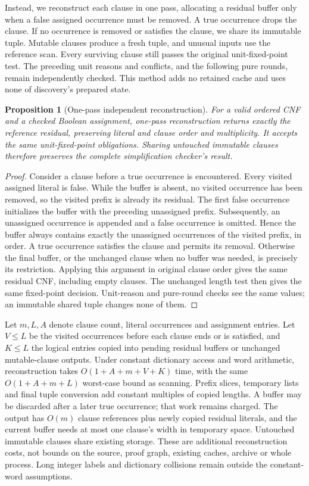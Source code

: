\documentclass[11pt,a4paper]{article}
\numberwithin{equation}{section}
\theoremstyle{plain}
\newtheorem{proposition}[lemma]{Proposition}
\theoremstyle{definition}
\theoremstyle{remark}
\begin{document}
Instead, we reconstruct each clause in one pass, allocating a residual buffer only when a false assigned occurrence must be removed. A true occurrence drops the clause. If no occurrence is removed or satisfies the clause, we share its immutable tuple. Mutable clauses produce a fresh tuple, and unusual inputs use the reference scan. Every surviving clause still passes the original unit-fixed-point test. The preceding unit reasons and conflicts, and the following pure rounds, remain independently checked. This method adds no retained cache and uses none of discovery's prepared state.

\begin{proposition}[One-pass independent reconstruction]
\label{prop:single-pass-check}
For a valid ordered CNF and a checked Boolean assignment, one-pass reconstruction returns exactly the reference residual, preserving literal and clause order and multiplicity. It accepts the same unit-fixed-point obligations. Sharing untouched immutable clauses therefore preserves the complete simplification checker's result.
\end{proposition}
\begin{proof}
Consider a clause before a true occurrence is encountered. Every visited assigned literal is false. While the buffer is absent, no visited occurrence has been removed, so the visited prefix is already its residual. The first false occurrence initializes the buffer with the preceding unassigned prefix. Subsequently, an unassigned occurrence is appended and a false occurrence is omitted. Hence the buffer always contains exactly the unassigned occurrences of the visited prefix, in order. A true occurrence satisfies the clause and permits its removal. Otherwise the final buffer, or the unchanged clause when no buffer was needed, is precisely its restriction. Applying this argument in original clause order gives the same residual CNF, including empty clauses. The unchanged length test then gives the same fixed-point decision. Unit-reason and pure-round checks see the same values; an immutable shared tuple changes none of them.
\end{proof}

Let $m,L,A$ denote clause count, literal occurrences and assignment entries. Let $V\leq L$ be the visited occurrences before each clause ends or is satisfied, and $K\leq L$ the logical entries copied into pending residual buffers or unchanged mutable-clause outputs. Under constant dictionary access and word arithmetic, reconstruction takes $O(1+A+m+V+K)$ time, with the same $O(1+A+m+L)$ worst-case bound as scanning. Prefix slices, temporary lists and final tuple conversion add constant multiples of copied lengths. A buffer may be discarded after a later true occurrence; that work remains charged. The output has $O(m)$ clause references plus newly copied residual literals, and the current buffer needs at most one clause's width in temporary space. Untouched immutable clauses share existing storage. These are additional reconstruction costs, not bounds on the source, proof graph, existing caches, archive or whole process. Long integer labels and dictionary collisions remain outside the constant-word assumptions.
\end{document}
